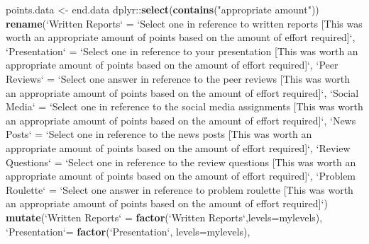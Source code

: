 \documentclass[]{article}
\newenvironment{Shaded}{\begin{snugshade}}{\end{snugshade}}
\newcommand{\KeywordTok}[1]{\textcolor[rgb]{0.13,0.29,0.53}{\textbf{{#1}}}}
\newcommand{\DataTypeTok}[1]{\textcolor[rgb]{0.13,0.29,0.53}{{#1}}}
\newcommand{\StringTok}[1]{\textcolor[rgb]{0.31,0.60,0.02}{{#1}}}
\newcommand{\NormalTok}[1]{{#1}}
\begin{document}
\begin{Shaded}
\begin{Highlighting}[]
\NormalTok{points.data <-}\StringTok{ }
\StringTok{  }\NormalTok{end.data %
\StringTok{  }\NormalTok{dplyr::}\KeywordTok{select}\NormalTok{(}\KeywordTok{contains}\NormalTok{(}\StringTok{"appropriate amount"}\NormalTok{)) %
\StringTok{  }\KeywordTok{rename}\NormalTok{(}\StringTok{`}\DataTypeTok{Written Reports}\StringTok{`} \NormalTok{=}\StringTok{ `}\DataTypeTok{Select one in reference to written reports [This was worth an appropriate amount of points based on the amount of effort required]}\StringTok{`}\NormalTok{,}
         \StringTok{`}\DataTypeTok{Presentation}\StringTok{`} \NormalTok{=}\StringTok{ `}\DataTypeTok{Select one in reference to your presentation [This was worth an appropriate amount of points based on the amount of effort required]}\StringTok{`}\NormalTok{,}
         \StringTok{`}\DataTypeTok{Peer Reviews}\StringTok{`} \NormalTok{=}\StringTok{ `}\DataTypeTok{Select one answer in reference to the peer reviews [This was worth an appropriate amount of points based on the amount of effort required]}\StringTok{`}\NormalTok{,}
         \StringTok{`}\DataTypeTok{Social Media}\StringTok{`} \NormalTok{=}\StringTok{ `}\DataTypeTok{Select one in reference to the social media assignments [This was worth an appropriate amount of points based on the amount of effort required]}\StringTok{`}\NormalTok{,}
         \StringTok{`}\DataTypeTok{News Posts}\StringTok{`} \NormalTok{=}\StringTok{ `}\DataTypeTok{Select one in reference to the news posts [This was worth an appropriate amount of points based on the amount of effort required]}\StringTok{`}\NormalTok{,}
         \StringTok{`}\DataTypeTok{Review Questions}\StringTok{`} \NormalTok{=}\StringTok{ `}\DataTypeTok{Select one in reference to the review questions [This was worth an appropriate amount of points based on the amount of effort required]}\StringTok{`}\NormalTok{,}
         \StringTok{`}\DataTypeTok{Problem Roulette}\StringTok{`} \NormalTok{=}\StringTok{ `}\DataTypeTok{Select one answer in reference to problem roulette [This was worth an appropriate amount of points based on the amount of effort required]}\StringTok{`}\NormalTok{) %
\StringTok{  }\KeywordTok{mutate}\NormalTok{(}\StringTok{`}\DataTypeTok{Written Reports}\StringTok{`} \NormalTok{=}\StringTok{ }\KeywordTok{factor}\NormalTok{(}\StringTok{`}\DataTypeTok{Written Reports}\StringTok{`}\NormalTok{,}\DataTypeTok{levels=}\NormalTok{mylevels),}
         \StringTok{`}\DataTypeTok{Presentation}\StringTok{`}\NormalTok{=}\StringTok{ }\KeywordTok{factor}\NormalTok{(}\StringTok{`}\DataTypeTok{Presentation}\StringTok{`}\NormalTok{, }\DataTypeTok{levels=}\NormalTok{mylevels),}
}}}
\end{Highlighting}
\end{Shaded}
\end{document}
